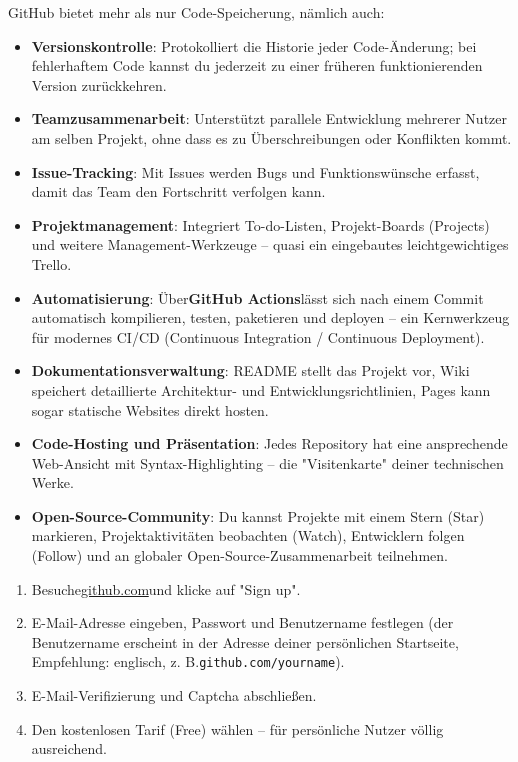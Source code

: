 
GitHub bietet mehr als nur Code-Speicherung, nämlich auch:

\begin{itemize}
  \item \textbf{Versionskontrolle}: Protokolliert die Historie jeder Code-Änderung; bei fehlerhaftem Code kannst du jederzeit zu einer früheren funktionierenden Version zurückkehren.
  \item \textbf{Teamzusammenarbeit}: Unterstützt parallele Entwicklung mehrerer Nutzer am selben Projekt, ohne dass es zu Überschreibungen oder Konflikten kommt.
  \item \textbf{Issue-Tracking}: Mit Issues werden Bugs und Funktionswünsche erfasst, damit das Team den Fortschritt verfolgen kann.
  \item \textbf{Projektmanagement}: Integriert To-do-Listen, Projekt-Boards (Projects) und weitere Management-Werkzeuge – quasi ein eingebautes leichtgewichtiges Trello.
  \item \textbf{Automatisierung}: Über\textbf{GitHub Actions}lässt sich nach einem Commit automatisch kompilieren, testen, paketieren und deployen – ein Kernwerkzeug für modernes CI/CD (Continuous Integration / Continuous Deployment).
  \item \textbf{Dokumentationsverwaltung}: README stellt das Projekt vor, Wiki speichert detaillierte Architektur- und Entwicklungsrichtlinien, Pages kann sogar statische Websites direkt hosten.
  \item \textbf{Code-Hosting und Präsentation}: Jedes Repository hat eine ansprechende Web-Ansicht mit Syntax-Highlighting – die "Visitenkarte" deiner technischen Werke.
  \item \textbf{Open-Source-Community}: Du kannst Projekte mit einem Stern (Star) markieren, Projektaktivitäten beobachten (Watch), Entwicklern folgen (Follow) und an globaler Open-Source-Zusammenarbeit teilnehmen.
\end{itemize}



\begin{enumerate}
  \item Besuche\href{https://github.com}{github.com}und klicke auf "Sign up".
  \item E-Mail-Adresse eingeben, Passwort und Benutzername festlegen (der Benutzername erscheint in der Adresse deiner persönlichen Startseite, Empfehlung: englisch, z. B.\texttt{github.\allowbreak com/\allowbreak yourname}).
  \item E-Mail-Verifizierung und Captcha abschließen.
  \item Den kostenlosen Tarif (Free) wählen – für persönliche Nutzer völlig ausreichend.
\end{enumerate}

